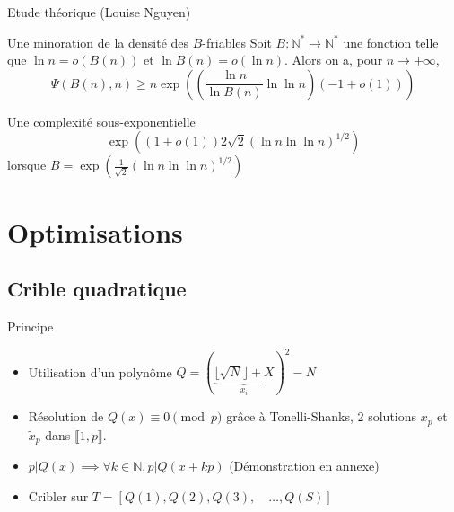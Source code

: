 \documentclass{beamer}
\begin{document}
\begin{frame}{Etude théorique (Louise Nguyen)}
    \begin{block}{Une minoration de la densité des $B$-friables}
    Soit $B : \mathbb N^\ast \to \mathbb N^\ast$ une fonction telle que $\ln n = o(B(n))$ et $\ln B(n) = o (\ln n)$. Alors on a, pour $n \to +\infty$,
    \[
    \Psi(B(n), n) \ge n\exp\left(\left(\frac {\ln n}{\ln B(n)} \ln \ln n\right)(-1 + o(1))\right)
    \]
    \end{block}
    \begin{block}{Une complexité sous-exponentielle}
    \[
    \exp\left((1+ o(1))2{\sqrt 2} (\ln n \ln \ln n)^{1/2}\right)
    \]
    lorsque $B =\exp\left(\frac 1{\sqrt 2}(\ln n\ln \ln n)^{1/2}\right)$
    \end{block}
\end{frame}

\section{Optimisations}
\subsection{Crible quadratique}

\begin{frame}{Principe}
    \begin{itemize}[<+->]
        \item Utilisation d'un polynôme $Q = (\underbrace{\lfloor\sqrt N\rfloor + X}_{x_i})^2 - N$ %
        \item Résolution de $Q(x) \equiv 0 \pmod p$ grâce à Tonelli-Shanks, 2 solutions $x_p$ et $\tilde{x}_p$ dans $\llbracket 1, p \rrbracket$.
        \item $p|Q(x) \implies \forall k\in \mathbb N,  p|Q(x+kp)$ (Démonstration en \hyperref[demo:qx]{annexe})
        \item Cribler sur $T=[Q(1), Q(2), Q(3), \quad\dots, Q(S)]$
    \end{itemize}
\end{frame}


\end{document}
